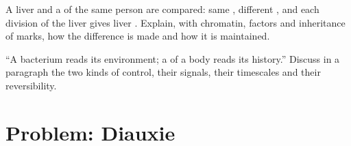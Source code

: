 \begin{exercise}[$\star\star\star$]\label{exo:b1:expression-control:11}
A liver  and a  of the same person are compared: same
, different , and each division of the liver 
gives liver . Explain, with chromatin, factors and inheritance of
marks, how the difference is made and how it is maintained.
\end{exercise}

\begin{exercise}[$\star\star\star$]\label{exo:b1:expression-control:12}
``A bacterium reads its environment; a  of a body reads its
history.'' Discuss in a paragraph the two kinds of control, their
signals, their timescales and their reversibility.
\end{exercise}

\section{Problem: Diauxie}

